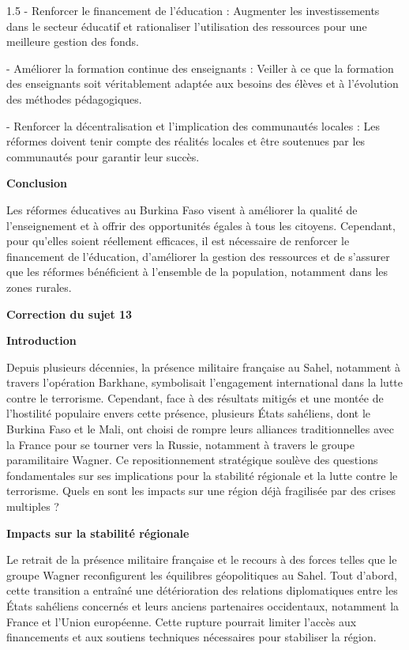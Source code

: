 \documentclass[12pt]{article}
\begin{document}
\begin{spacing}{1.5}
   - Renforcer le financement de l'éducation : Augmenter les investissements dans le secteur éducatif et rationaliser l'utilisation des ressources pour une meilleure gestion des fonds.  
   
   - Améliorer la formation continue des enseignants : Veiller à ce que la formation des enseignants soit véritablement adaptée aux besoins des élèves et à l'évolution des méthodes pédagogiques. 
    
   - Renforcer la décentralisation et l'implication des communautés locales : Les réformes doivent tenir compte des réalités locales et être soutenues par les communautés pour garantir leur succès.

\textbf{Conclusion}

Les réformes éducatives au Burkina Faso visent à améliorer la qualité de l'enseignement et à offrir des opportunités égales à tous les citoyens. Cependant, pour qu'elles soient réellement efficaces, il est nécessaire de renforcer le financement de l'éducation, d'améliorer la gestion des ressources et de s'assurer que les réformes bénéficient à l'ensemble de la population, notamment dans les zones rurales.



\quad

\textbf{Correction du sujet 13}



\textbf{Introduction}

Depuis plusieurs décennies, la présence militaire française au Sahel, notamment à travers l’opération Barkhane, symbolisait l’engagement international dans la lutte contre le terrorisme. Cependant, face à des résultats mitigés et une montée de l’hostilité populaire envers cette présence, plusieurs États sahéliens, dont le Burkina Faso et le Mali, ont choisi de rompre leurs alliances traditionnelles avec la France pour se tourner vers la Russie, notamment à travers le groupe paramilitaire Wagner. Ce repositionnement stratégique soulève des questions fondamentales sur ses implications pour la stabilité régionale et la lutte contre le terrorisme. Quels en sont les impacts sur une région déjà fragilisée par des crises multiples ?

\quad

\textbf{Impacts sur la stabilité régionale}

Le retrait de la présence militaire française et le recours à des forces telles que le groupe Wagner reconfigurent les équilibres géopolitiques au Sahel. Tout d’abord, cette transition a entraîné une détérioration des relations diplomatiques entre les États sahéliens concernés et leurs anciens partenaires occidentaux, notamment la France et l’Union européenne. Cette rupture pourrait limiter l’accès aux financements et aux soutiens techniques nécessaires pour stabiliser la région.


\end{spacing}
\end{document}
